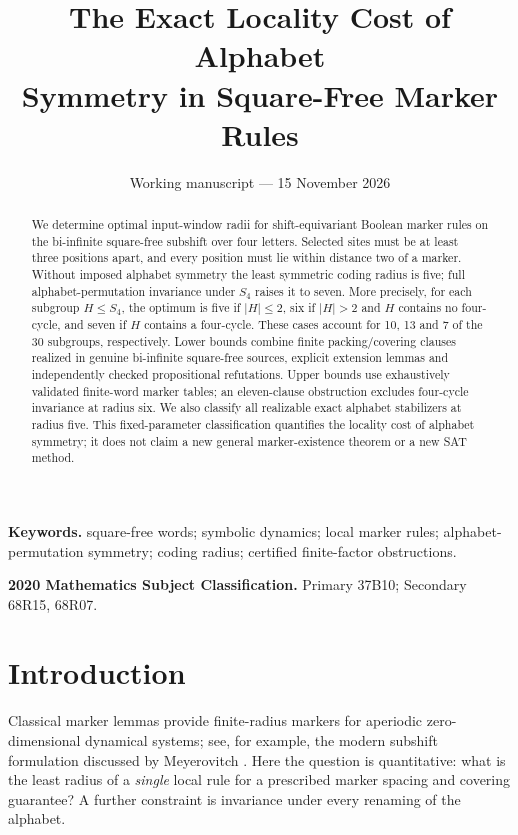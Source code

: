 \documentclass[11pt]{article}
\title{The Exact Locality Cost of Alphabet\\Symmetry in Square-Free Marker Rules}
\author{}
\date{Working manuscript --- 15 November 2026}
\theoremstyle{remark}
\begin{document}
\maketitle

\begin{abstract}
We determine optimal input-window radii for shift-equivariant Boolean
marker rules on the bi-infinite square-free subshift over four letters.
Selected sites must be at least three positions apart, and every
position must lie within distance two of a marker. Without imposed
alphabet symmetry the least symmetric coding radius is five; full
alphabet-permutation invariance under $S_4$ raises it to seven.
More precisely, for each subgroup $H\le S_4$, the optimum is five
if $|H|\le2$, six if $|H|>2$ and $H$ contains no four-cycle, and
seven if $H$ contains a four-cycle. These cases account for
10, 13 and 7 of the 30 subgroups, respectively.
Lower bounds combine finite packing/covering clauses realized
in genuine bi-infinite square-free sources, explicit extension
lemmas and independently checked propositional refutations.
Upper bounds use exhaustively validated finite-word marker
tables; an eleven-clause obstruction excludes four-cycle
invariance at radius six. We also classify all realizable exact
alphabet stabilizers at radius five. This fixed-parameter
classification quantifies the locality cost of alphabet
symmetry; it does not claim a new general marker-existence
theorem or a new SAT method.
\end{abstract}

\noindent\textbf{Keywords.}
square-free words; symbolic dynamics; local marker rules;
alphabet-permutation symmetry; coding radius; certified
finite-factor obstructions.

\noindent\textbf{2020 Mathematics Subject Classification.}
Primary 37B10; Secondary 68R15, 68R07.

\section{Introduction}

Classical marker lemmas provide finite-radius markers for aperiodic
zero-dimensional dynamical systems; see, for example, the modern
subshift formulation discussed by Meyerovitch
\cite{meyerovitch2025embedding}. Here the question is quantitative:
what is the least radius of a \emph{single} local rule for a prescribed
marker spacing and covering guarantee? A further constraint is
invariance under every renaming of the alphabet.
\end{document}
